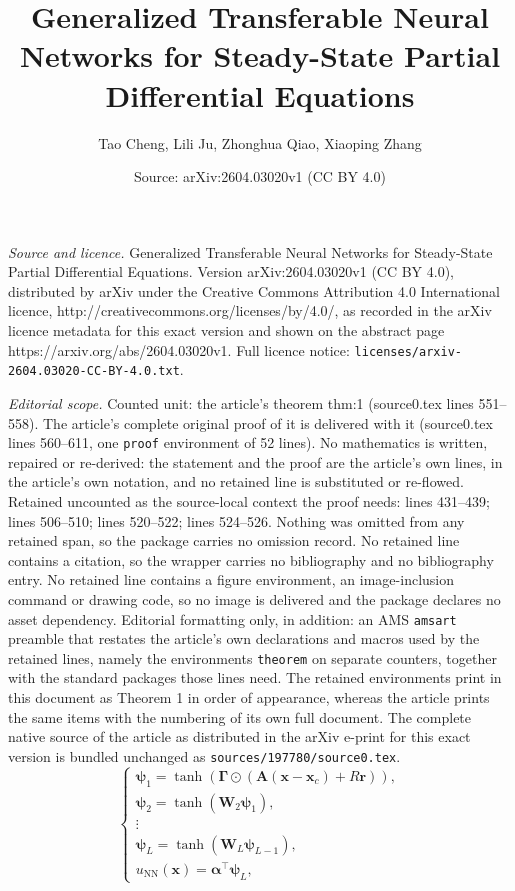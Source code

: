 \documentclass[10pt,a4paper]{amsart}
\title{Generalized Transferable Neural Networks for Steady-State Partial Differential Equations}
\author{Tao Cheng, Lili Ju, Zhonghua Qiao, Xiaoping Zhang}
\date{Source: arXiv:2604.03020v1 (CC BY 4.0)}
\newcommand{\bA}{\mathbf{A}}
\newcommand{\bW}{\mathbf{W}}
\newcommand{\br}{\mathbf{r}}
\newcommand{\valpha}{{\boldsymbol{\alpha}}}
\newcommand{\vpsi}{\boldsymbol{\psi}}
\begin{document}
\maketitle

\noindent\emph{Source and licence.} Generalized Transferable Neural Networks for Steady-State Partial Differential Equations. Version arXiv:2604.03020v1 (CC BY 4.0), distributed by arXiv under the Creative Commons Attribution 4.0 International licence, http://creativecommons.org/licenses/by/4.0/, as recorded in the arXiv licence metadata for this exact version and shown on the abstract page https://arxiv.org/abs/2604.03020v1. Full licence notice: \texttt{licenses/arxiv-2604.03020-CC-BY-4.0.txt}.\par\smallskip

\noindent\textit{Editorial scope.} Counted unit: the article's theorem thm:1 (source0.tex lines 551--558). The article's complete original proof of it is delivered with it (source0.tex lines 560--611, one \texttt{proof} environment of 52 lines). No mathematics is written, repaired or re-derived: the statement and the proof are the article's own lines, in the article's own notation, and no retained line is substituted or re-flowed.  Retained uncounted as the source-local context the proof needs: lines 431--439; lines 506--510; lines 520--522; lines 524--526.  Nothing was omitted from any retained span, so the package carries no omission record.  No retained line contains a citation, so the wrapper carries no bibliography and no bibliography entry.  No retained line contains a figure environment, an image-inclusion command or drawing code, so no image is delivered and the package declares no asset dependency.  Editorial formatting only, in addition: an AMS \texttt{amsart} preamble that restates the article's own declarations and macros used by the retained lines, namely the environments \texttt{theorem} on separate counters, together with the standard packages those lines need.  The retained environments print in this document as Theorem 1 in order of appearance, whereas the article prints the same items with the numbering of its own full document.  The complete native source of the article as distributed in the arXiv e-print for this exact version is bundled unchanged as \texttt{sources/197780/source0.tex}.
\begin{equation}\label{eq:g_transnet}
    \begin{cases}
        \vpsi_1 = \tanh({\mathbf\Gamma}\odot(\bA(\mathbf{x}-\mathbf{x}_c) + R\br)), \\
        \vpsi_2 = \tanh(\bW_2\vpsi_1), \\
        \vdots\\
        \vpsi_L = \tanh(\bW_L\vpsi_{L-1}), \\
        u_{\mathrm{NN}}(\mathbf{x}) = \valpha^\top \vpsi_L,
    \end{cases}
\end{equation}
\end{document}
